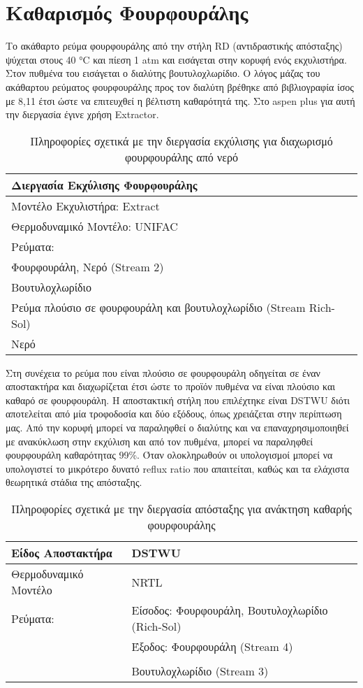 \documentclass[11pt]{article}
\begin{document}
\section{Καθαρισμός Φουρφουράλης}
\label{sec:org57364cb}
Το ακάθαρτο ρεύμα φουρφουράλης από την στήλη RD (αντιδραστικής
απόσταξης) ψύχεται στους 40 °C και πίεση 1 atm και εισάγεται στην κορυφή
ενός εκχυλιστήρα. Στον πυθμένα του εισάγεται ο διαλύτης βουτυλοχλωρίδιο.
Ο λόγος μάζας του ακάθαρτου ρεύματος φουρφουράλης προς τον διαλύτη
βρέθηκε από βιβλιογραφία ίσος με 8,11 \cite{nhienNovelHybridReactive2021} έτσι ώστε να επιτευχθεί η βέλτιστη
καθαρότητά της. Στο aspen plus για αυτή την διεργασία έγινε χρήση
Extractor.

\begin{table}[htbp]
\caption{Πληροφορίες σχετικά με την διεργασία εκχύλισης για διαχωρισμό φουρφουράλης από νερό}
\centering
\begin{tabular}{l}
Διεργασία Εκχύλισης Φουρφουράλης\\
\hline
Μοντέλο Εκχυλιστήρα: Extract\\
Θερμοδυναμικό Μοντέλο: UNIFAC\\
\hline
Ρεύματα:\\
\hline
Φουρφουράλη, Νερό (Stream 2)\\
Βουτυλοχλωρίδιο\\
\hline
Ρεύμα πλούσιο σε φουρφουράλη και βουτυλοχλωρίδιο (Stream Rich-Sol)\\
Νερό\\
\hline
\end{tabular}
\end{table}

Στη συνέχεια το ρεύμα που είναι πλούσιο σε φουρφουράλη οδηγείται σε έναν
αποστακτήρα και διαχωρίζεται έτσι ώστε το προϊόν πυθμένα να είναι
πλούσιο και καθαρό σε φουρφουράλη. Η αποστακτική στήλη που επιλέχτηκε
είναι DSTWU διότι αποτελείται από μία τροφοδοσία και δύο εξόδους, όπως
χρειάζεται στην περίπτωση μας. Από την κορυφή μπορεί να παραληφθεί ο
διαλύτης και να επαναχρησιμοποιηθεί με ανακύκλωση στην εκχύλιση και από
τον πυθμένα, μπορεί να παραληφθεί φουρφουράλη καθαρότητας 99\%. Όταν
ολοκληρωθούν οι υπολογισμοί μπορεί να υπολογιστεί το μικρότερο δυνατό
reflux ratio που απαιτείται, καθώς και τα ελάχιστα θεωρητικά στάδια της
απόσταξης.

\begin{table}[htbp]
\caption{Πληροφορίες σχετικά με την διεργασία απόσταξης για ανάκτηση καθαρής φουρφουράλης}
\centering
\begin{tabular}{ll}
Είδος Αποστακτήρα & DSTWU\\
\hline
Θερμοδυναμικό Μοντέλο & NRTL\\
Ρεύματα: & Είσοδος: Φουρφουράλη, Βουτυλοχλωρίδιο (Rich-Sol)\\
 & Έξοδος: Φουρφουράλη (Stream 4)\\
 & \\
 & Βουτυλοχλωρίδιο (Stream 3)\\
\end{tabular}
\end{table}
\end{document}
